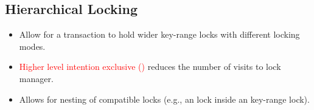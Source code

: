 \documentclass[11pt]{article}
\newcommand{\rr}[1]{\textcolor{red}{#1}}
\begin{document}
\subsection*{Hierarchical Locking}
\begin{itemize}
    \item
    Allow for a transaction to hold wider key-range locks with different locking modes.
    
    \item
    \rr{Higher level intention exclusive ()} reduces the number of visits to lock manager.
    
    \item Allows for nesting of compatible locks (e.g., an  lock inside an  
    key-range lock).
\end{itemize}

\newpage


\end{document}
